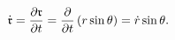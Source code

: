 \begin{equation*}
{\dot{\frak{r}}}=\frac{\partial \frak{r}}{\partial t}=\frac{\partial }{%
\partial t}\left( r\sin \theta \right) =\dot{r}\sin \theta .
\end{equation*}

